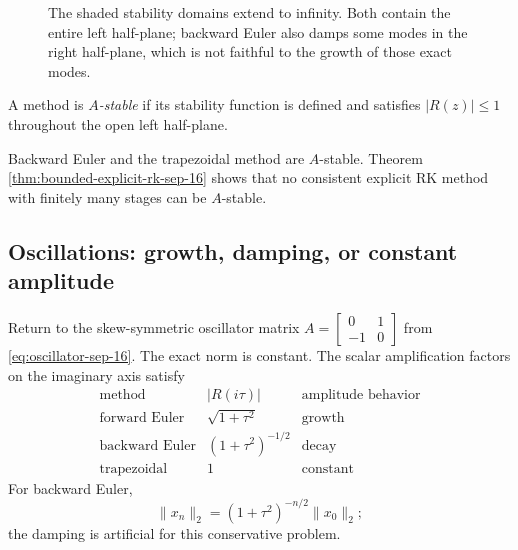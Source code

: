 \begin{figure}[htbp]
\centering
{}
\caption{The shaded stability domains extend to infinity. Both contain
the entire left half-plane; backward Euler also damps some modes in
the right half-plane, which is not faithful to the growth of those
exact modes.}
\end{figure}

\begin{definition}[\(A\)-stability]
 A method is \emph{\(A\)-stable} if its stability function is defined
 and satisfies \(|R(z)|\leq1\) throughout the open left half-plane.
\end{definition}

Backward Euler and the trapezoidal method are \(A\)-stable. Theorem~
\ref{thm:bounded-explicit-rk-sep-16} shows that no consistent explicit
RK method with finitely many stages can be \(A\)-stable.

\subsection{Oscillations: growth, damping, or constant amplitude}

Return to the skew-symmetric oscillator matrix
\(A=\left[\begin{smallmatrix}0&1\\-1&0\end{smallmatrix}\right]\)
from \eqref{eq:oscillator-sep-16}. The exact norm is constant. The
scalar amplification factors on the imaginary axis satisfy
\[
\begin{array}{c|c|c}
 \text{method}&|R(i\tau)|&\text{amplitude behavior}\\ \hline
 \text{forward Euler}&\sqrt{1+\tau^2}&\text{growth}\\
 \text{backward Euler}&(1+\tau^2)^{-1/2}&\text{decay}\\
 \text{trapezoidal}&1&\text{constant}
\end{array}
\]
For backward Euler,
\[
 \|x_n\|_2=(1+\tau^2)^{-n/2}\|x_0\|_2;
\]
the damping is artificial for this conservative problem.


